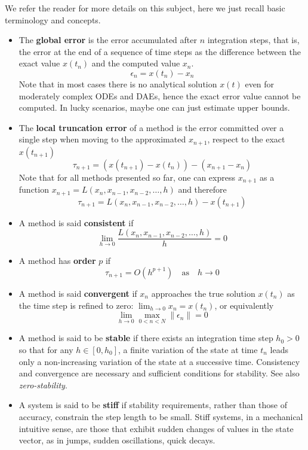 \documentclass{digitaldynamics}
\begin{document}
We refer the reader for more details on this subject, here we just recall basic terminology and concepts.

\begin{itemize}

	\item
	The \textbf{global error} is the error accumulated after $n$ integration steps, that is, the error at the end of a sequence of time steps 
	as the difference between the exact value $x(t_{n})$ and the computed value $x_{n}$.
	\[
	\epsilon_n = x(t_{n}) - x_{n}
	\]
	Note that in most cases there is no analytical solution $x(t)$ even for moderately complex
	ODEs and DAEs, hence the exact error value cannot be computed. In lucky scenarios, maybe one can just estimate upper bounds.
	
	\item 
	The \textbf{local truncation error} of a method is the error committed over a single step when moving to the approximated $x_{n+1}$, respect to the exact $x(t_{n+1})$ 
	\[
	\tau_{n+1} = \left(x(t_{n+1}) - x(t_n) \right) - \left(x_{n+1}  - x_{n} \right)
	\]
	Note that for all methods presented so far, one can express $x_{n+1}$ as a function $x_{n+1} = L(x_{n},x_{n-1},x_{n-2},\ldots,h)$
	and therefore 
	\[
	\tau_{n+1} =  L(x_{n},x_{n-1},x_{n-2},\ldots,h)  -  x(t_{n+1})
	\]
	
	\item 
	A method is said \textbf{consistent} if 
	\[
	\lim_{h \rightarrow 0} \frac{L(x_{n},x_{n-1},x_{n-2},\ldots,h)}{h} = 0
	\]
	
	\item
	A method has \textbf{order} $p$ if
	\[
	\tau_{n+1} = O(h^{p+1}) \quad \mathrm{as} \quad h\rightarrow 0
	\]
	
	\item 
	A method is said \textbf{convergent} if $x_{n}$ approaches the true solution $x(t_{n})$ as the time step is refined to zero: $\lim_{h \rightarrow 0} x_{n} = x(t_{n})$, or equivalently
	\[
	\lim_{h \rightarrow 0} \max_{0<n<N} \| \epsilon_n \| = 0
	\]
	
	\item 
	A method is said to be \textbf{stable} if there exists an integration time step $h_0>0$ so that for any $h\in[0,h_0]$, 
	a finite variation of the state at time $t_n$ leads only a non-increasing variation of the state at a successive time.
	Consistency and convergence are necessary and sufficient conditions for stability. See also \textit{zero-stability}.
	
	\item
	A system is said to be \textbf{stiff} if stability requirements, rather than those of accuracy, constrain the step length to be small. 
	Stiff systems, in a mechanical intuitive sense, are those that exhibit sudden changes of values in the state vector, as in jumps, sudden
	oscillations, quick decays. 
	

\end{itemize}
\end{document}
